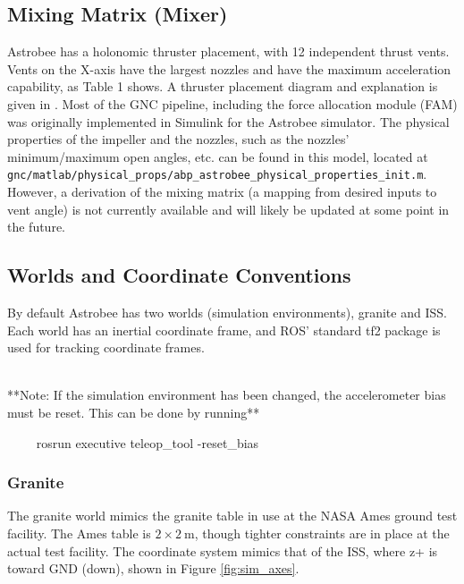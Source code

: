 \documentclass{article}
\begin{document}
\subsection{Mixing Matrix (Mixer)} 
Astrobee has a holonomic thruster placement, with 12 independent thrust vents. Vents on the X-axis have the largest nozzles and have the maximum acceleration capability, as Table 1 shows. A thruster placement diagram and explanation is given in \cite{Smith2016}. Most of the GNC pipeline, including the force allocation module (FAM) was originally implemented in Simulink for the Astrobee simulator. The physical properties of the impeller and the nozzles, such as the nozzles' minimum/maximum open angles, etc. can be found in this model, located at\\ \texttt{gnc/matlab/physical\_props/abp\_astrobee\_physical\_properties\_init.m}. However, a derivation of the mixing matrix (a mapping from desired inputs to vent angle) is not currently available and will likely be updated at some point in the future.



\subsection{Worlds and Coordinate Conventions}
By default Astrobee has two worlds (simulation environments), granite and ISS. Each world has an inertial coordinate frame, and ROS' standard tf2 package is used for tracking coordinate frames.
\\\\
\begin{markdown}
**Note: If the simulation environment has been changed, the accelerometer bias must be reset. This can be done by running**

~~~~
rosrun executive teleop_tool -reset_bias
~~~~
\end{markdown}


\subsubsection{Granite}
The granite world mimics the granite table in use at the NASA Ames ground test facility. The Ames table is $2 \times 2\ \text{m}$, though tighter constraints are in place at the actual test facility. The coordinate system mimics that of the ISS, where z+ is toward GND (down), shown in Figure \ref{fig:sim_axes}.
\end{document}
